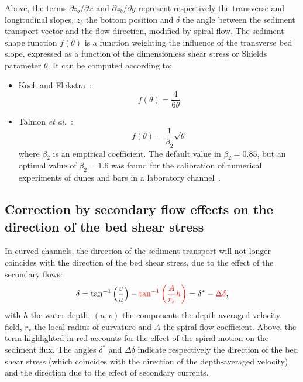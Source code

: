 Above, the terms $\partial z_b/\partial x$ and $\partial z_b/\partial y$ represent respectively the transverse and longitudinal slopes, $z_b$ the bottom position and $\delta$ the angle between the sediment transport vector and the flow direction, modified by spiral flow. The sediment shape function $f(\theta)$ is a function weighting the influence of the transverse bed slope, expressed as a function of the dimensionless shear stress or Shields parameter $\theta$. It can be computed according to:

\begin{itemize}
\item Koch and Flokstra~\cite{KochFlokstra80}:
\begin{equation*}
f(\theta) = \frac{4}{6\theta}
\end{equation*}
\item Talmon \textit{et al.}~\cite{Talmon95}:
\begin{equation*}
f(\theta) = \frac{1}{\beta_2}\sqrt{\theta}
\end{equation*}
where $\beta_2$ is an empirical coefficient. The default value in $\beta_2=0.85$, but an optimal value of $\beta_2=1.6$ was found for the calibration of numerical experiments of dunes and bars in a laboratory channel~\cite{Mendoza15}.
\end{itemize}

\subsection{Correction by secondary flow effects on the direction of the bed shear stress}
In curved channels, the direction of the sediment transport will not longer coincides with the direction of the bed shear stress,
due to the effect of the secondary flows:
\begin{equation}\label{eq:delta}
\delta = \tan^{-1}\left(\frac{v}{u}\right) - \textcolor{red}{\tan^{-1}\left(\frac{A}{r_s}h\right)} = \delta^* - \textcolor{red}{\Delta\delta},
\end{equation}
with $h$ the water depth, $(u, v)$ the components the depth-averaged velocity field, $r_s$ the local radius of curvature and $A$ the spiral flow coefficient. Above, the term highlighted in red accounts for the effect of the spiral motion on the sediment flux. The angles $\delta^*$ and $\Delta\delta$ indicate respectively the direction of the bed shear stress (which coincides with the direction of the depth-averaged velocity) and the direction due to the effect of secondary currents.

